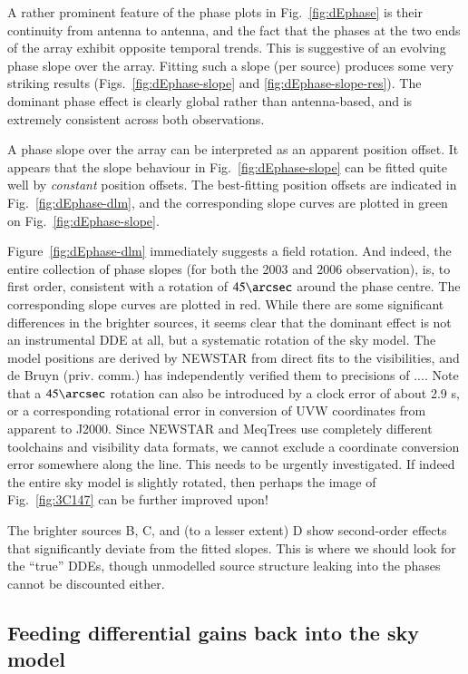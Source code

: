 \documentclass[]{aa}
\begin{document}
A rather prominent feature of the phase plots in Fig.~\ref{fig:dEphase} is their continuity from antenna to antenna, and the fact that the phases at the two ends of the array exhibit opposite temporal trends. This is suggestive of an evolving phase slope over the array. Fitting such a slope (per source) produces some very striking results (Figs.~\ref{fig:dEphase-slope} and \ref{fig:dEphase-slope-res}). The dominant phase effect is clearly global rather than antenna-based, and is extremely consistent across both observations.

A phase slope over the array can be interpreted as an apparent position offset. It appears that the slope behaviour in Fig.~\ref{fig:dEphase-slope} can be fitted quite well by \emph{constant} position offsets. 
The best-fitting position offsets are indicated in Fig.~\ref{fig:dEphase-dlm}, and the corresponding slope curves are plotted in green on Fig.~\ref{fig:dEphase-slope}. 

Figure~\ref{fig:dEphase-dlm} immediately suggests a field rotation. And indeed, the entire collection of phase slopes (for both the 2003 and 2006 observation), is, to first order, consistent with a rotation of $45\arcsec$ around the phase centre. The corresponding slope curves are plotted in red. While there are some significant differences in the brighter sources, it seems clear that the dominant effect is not an instrumental DDE at all, but a systematic rotation of the sky model. The model positions are derived by NEWSTAR from direct fits to the visibilities, and de Bruyn (priv. comm.) has independently verified them to precisions of .... Note that a $45\arcsec$ rotation can also be introduced by a clock error of about 2.9 s, or a corresponding rotational error in conversion of UVW coordinates from apparent to J2000. Since NEWSTAR and MeqTrees use completely different toolchains and visibility data formats, we cannot exclude a coordinate conversion error somewhere along the line. This needs to be urgently investigated. If indeed the entire sky model is slightly rotated, then perhaps the image of Fig.~\ref{fig:3C147} can be further improved upon!

The brighter sources B, C, and (to a lesser extent) D show second-order effects that significantly deviate from the fitted slopes. This is where we should look for the ``true'' DDEs, though unmodelled source structure leaking into the phases cannot be discounted either. 

\subsection{Feeding differential gains back into the sky model\label{sec:model-improvement}}
\end{document}
